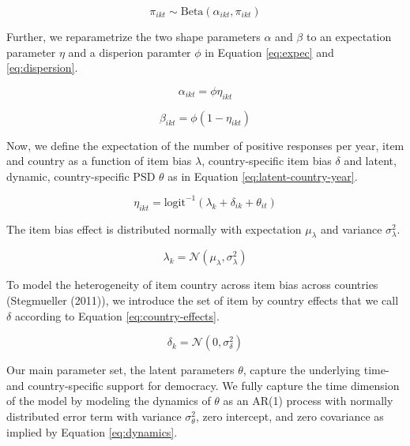 \documentclass[12pt,english,a4paper,oneside]{article}
\theoremstyle{definition}
\theoremstyle{definition}
\theoremstyle{definition}
\theoremstyle{definition}
\theoremstyle{remark}
\begin{document}
\begin{equation}
\label{eq:prob-yes}
\pi_{ikt} \sim \text{Beta}(\alpha_{ikt}, \pi_{ikt})
\end{equation}

\noindent
Further, we reparametrize the two shape parameters \(\alpha\) and \(\beta\) to an expectation parameter \(\eta\) and a disperion paramter \(\phi\) in Equation \eqref{eq:expec} and \eqref{eq:dispersion}.

\begin{equation}
\label{eq:expec}
\alpha_{ikt} = \phi \eta_{ikt}
\end{equation}

\begin{equation}
\label{eq:dispersion}
\beta_{ikt} = \phi (1 - \eta_{ikt})
\end{equation}

\noindent
Now, we define the expectation of the number of positive responses per year, item and country as a function of item bias \(\lambda\), country-specific item bias \(\delta\) and latent, dynamic, country-specific PSD \(\theta\) as in Equation \eqref{eq:latent-country-year}.

\begin{equation}
\label{eq:latent-country-year}
\eta_{ikt} = \text{logit}^{-1}(\lambda_k + \delta_{ik} + \theta_{it})
\end{equation}

\noindent
The item bias effect is distributed normally with expectation \(\mu_{\lambda}\) and variance \(\sigma_{\lambda}^2\).

\begin{equation}
\label{eq:item-intercept}
\lambda_k = \mathcal{N}(\mu_{\lambda}, \sigma_{\lambda}^2)
\end{equation}

\noindent
To model the heterogeneity of item country across item bias across countries (Stegmueller (2011)), we introduce the set of item by country effects that we call \(\delta\) according to Equation \eqref{eq:country-effects}.

\begin{equation}
\label{eq:country-effects}
\delta_k = \mathcal{N}(0, \sigma_{\delta}^2)
\end{equation}

\noindent
Our main parameter set, the latent parameters \(\theta\), capture the underlying time- and country-specific support for democracy. We fully capture the time dimension of the model by modeling the dynamics of \(\theta\) as an AR(1) process with normally distributed error term with variance \(\sigma_{\theta}^2\), zero intercept, and zero covariance as implied by Equation \eqref{eq:dynamics}.
\end{document}
